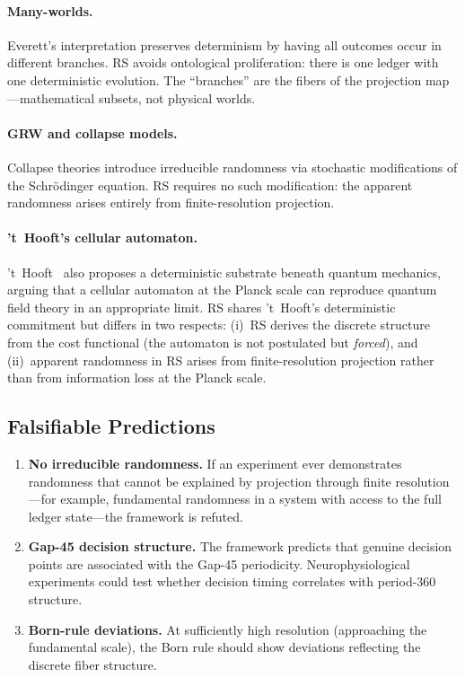 \documentclass[12pt,a4paper]{article}
\theoremstyle{definition}
\theoremstyle{remark}
\begin{document}
\paragraph{Many-worlds.}  Everett's interpretation preserves determinism
by having all outcomes occur in different branches.  RS avoids ontological
proliferation: there is one ledger with one deterministic evolution.
The ``branches'' are the fibers of the projection map---mathematical
subsets, not physical worlds.

\paragraph{GRW and collapse models.}  Collapse theories introduce
irreducible randomness via stochastic modifications of the
Schr\"odinger equation.  RS requires no such modification: the apparent
randomness arises entirely from finite-resolution projection.

\paragraph{'t~Hooft's cellular automaton.}
't~Hooft~\cite{tHooft2016} also proposes a deterministic substrate
beneath quantum mechanics, arguing that a cellular automaton at the
Planck scale can reproduce quantum field theory in an appropriate
limit.  RS shares 't~Hooft's deterministic commitment but differs in
two respects: (i)~RS derives the discrete structure from the cost
functional (the automaton is not postulated but \emph{forced}), and
(ii)~apparent randomness in RS arises from finite-resolution
projection rather than from information loss at the Planck scale.

\subsection{Falsifiable Predictions}

\begin{enumerate}
  \item \textbf{No irreducible randomness.}  If an experiment ever
  demonstrates randomness that cannot be explained by projection through
  finite resolution---for example, fundamental randomness in a system
  with access to the full ledger state---the framework is refuted.

  \item \textbf{Gap-45 decision structure.}  The framework predicts that
  genuine decision points are associated with the Gap-45 periodicity.
  Neurophysiological experiments could test whether decision timing
  correlates with period-360 structure.

  \item \textbf{Born-rule deviations.}  At sufficiently high resolution
  (approaching the fundamental scale), the Born rule should show
  deviations reflecting the discrete fiber structure.
\end{enumerate}
\end{document}
